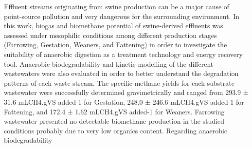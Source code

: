 Effluent streams originating from swine production can be a major cause of point-source pollution and very dangerous for the surrounding environment. In this work, biogas and biomethane potential of swine-derived effluents was assessed under mesophilic conditions among different production stages (Farrowing, Gestation, Weaners, and Fattening) in order to investigate the suitability of anaerobic digestion as a treatment technology and energy recovery tool. Anaerobic biodegradability and kinetic modelling of the different wastewaters were also evaluated in order to better understand the degradation patterns of each waste stream. The specific methane yields for each substrate wastewater were successfully determined gravimetrically and ranged from 293.9 ± 31.6 mLCH4.gVS added-1 for Gestation, 248.0 ± 246.6 mLCH4.gVS added-1 for Fattening, and 172.4 ± 1.62 mLCH4.gVS added-1 for Weaners. Farrowing wastewater presented no detectable biomethane production in the studied conditions probably due to very low organics content. Regarding anaerobic biodegradability